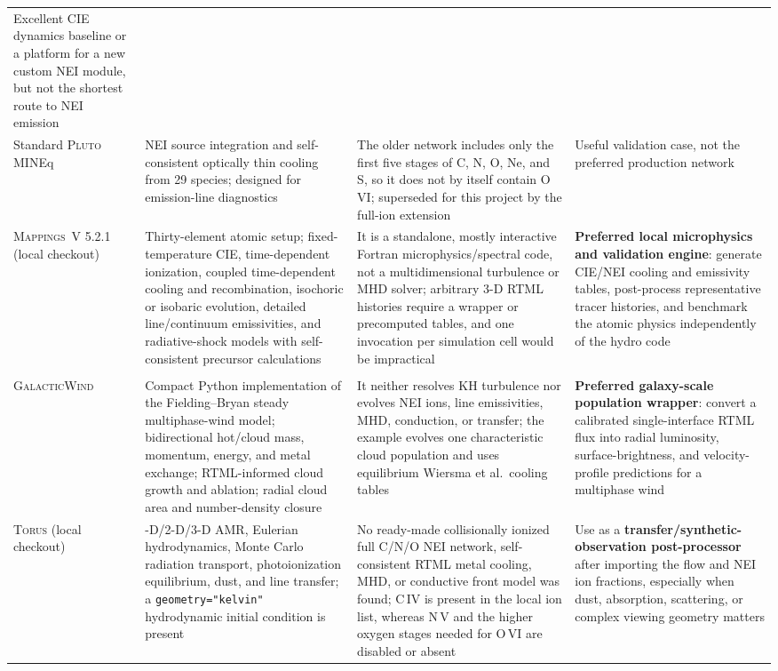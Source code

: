 \documentclass[english,a4paper]{my_memo2}
\begin{document}
\begin{longtable}{
 >{\raggedright\arraybackslash}p{2.4cm}
 >{\raggedright\arraybackslash}p{3.4cm}
 >{\raggedright\arraybackslash}p{4.5cm}
 >{\raggedright\arraybackslash}p{3.4cm}}
Excellent CIE dynamics baseline or a platform for a new custom NEI module,
but not the shortest route to NEI emission \cite{Stone2020,TanOh2021}\\
Standard \textsc{Pluto} MINEq &
NEI source integration and self-consistent optically thin cooling from 29
species; designed for emission-line diagnostics &
The older network includes only the first five stages of C, N, O, Ne, and S,
so it does not by itself contain O\,VI; superseded for this project by the
full-ion extension &
Useful validation case, not the preferred production network
\cite{Tesileanu2008}\\
\textsc{Mappings~V} 5.2.1 (local checkout) &
Thirty-element atomic setup; fixed-temperature CIE, time-dependent
ionization, coupled time-dependent cooling and recombination, isochoric or
isobaric evolution, detailed line/continuum emissivities, and radiative-shock
models with self-consistent precursor calculations &
It is a standalone, mostly interactive Fortran microphysics/spectral code,
not a multidimensional turbulence or MHD solver; arbitrary 3-D RTML histories
require a wrapper or precomputed tables, and one invocation per simulation
cell would be impractical &
\textbf{Preferred local microphysics and validation engine}: generate
CIE/NEI cooling and emissivity tables, post-process representative tracer
histories, and benchmark the atomic physics independently of the hydro code
\cite{Sutherland2017}\\
{\footnotesize\shortstack[l]{\textsc{Multiphase}\\
\textsc{GalacticWind}}} &
Compact Python implementation of the Fielding--Bryan steady multiphase-wind
model; bidirectional hot/cloud mass, momentum, energy, and metal exchange;
RTML-informed cloud growth and ablation; radial cloud area and number-density
closure &
It neither resolves KH turbulence nor evolves NEI ions, line emissivities,
MHD, conduction, or transfer; the example evolves one characteristic cloud
population and uses equilibrium Wiersma et al.\ cooling tables &
\textbf{Preferred galaxy-scale population wrapper}: convert a calibrated
single-interface RTML flux into radial luminosity, surface-brightness, and
velocity-profile predictions for a multiphase wind
\cite{FieldingBryan2022,Wiersma2009}\\
\textsc{Torus} (local checkout) &
1-D/2-D/3-D AMR, Eulerian hydrodynamics, Monte Carlo radiation transport,
photoionization equilibrium, dust, and line transfer; a
\texttt{geometry="kelvin"} hydrodynamic initial condition is present &
No ready-made collisionally ionized full C/N/O NEI network, self-consistent
RTML metal cooling, MHD, or conductive front model was found; C\,IV is
present in the local ion list, whereas N\,V and the higher oxygen stages
needed for O\,VI are disabled or absent &
Use as a \textbf{transfer/synthetic-observation post-processor} after importing
the flow and NEI ion fractions, especially when dust, absorption, scattering,
or complex viewing geometry matters \cite{Harries2019}\\
\bottomrule
\end{longtable}
\end{document}

